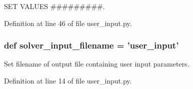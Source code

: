 S\-E\-T V\-A\-L\-U\-E\-S \#\#\#\#\#\#\#\#\#. 



Definition at line 46 of file user\-\_\-input.\-py.

\hypertarget{namespaceuser__input_a3f0eac40d15827c89da9b17cc74564dc}{
\subsubsection[{solver\-\_\-input\-\_\-filename}]{\setlength{\rightskip}{0pt plus 5cm}def solver\-\_\-input\-\_\-filename = 'user\-\_\-input'}}\label{namespaceuser__input_a3f0eac40d15827c89da9b17cc74564dc}


Set filename of output file containing user input parameters. 



Definition at line 14 of file user\-\_\-input.\-py.


